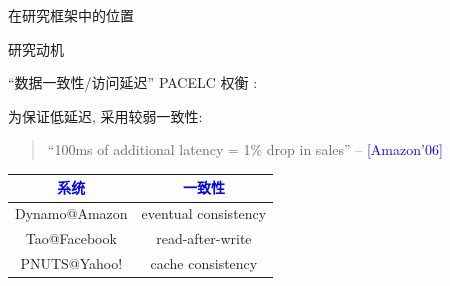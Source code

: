 \begin{frame}{在研究框架中的位置}
\end{frame}

\begin{frame}{研究动机}
  \vspace{0.30cm}

  ``数据一致性/访问延迟'' PACELC 权衡 :



  为保证低延迟, 采用较弱一致性:
  \begin{quote}
    ``{\small 100ms of additional latency = 1\% drop in sales}'' \hfill -- {\scriptsize 
      \textcolor{blue}{[Amazon'06]}} \end{quote}

  {\small
  \begin{table}
    \begin{tabular}{c|c}
      \hline
      \textcolor{blue}{\bf 系统} & \textcolor{blue}{\bf 一致性}		\\ \hline
      Dynamo@Amazon & eventual consistency \\ \hline
      Tao@Facebook & read-after-write \\ \hline
      PNUTS@Yahoo! & cache consistency \\ \hline
    \end{tabular}
  \end{table}
  }
\end{frame}


